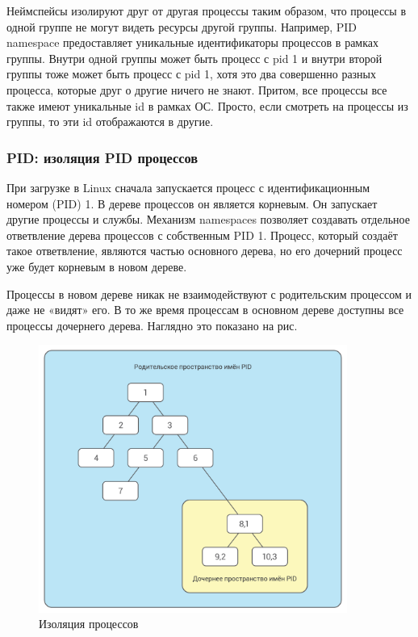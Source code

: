 Неймспейсы изолируют друг от другая процессы таким образом, что процессы в одной группе не могут видеть ресурсы другой группы. Например, PID namespace предоставляет уникальные идентификаторы процессов в рамках группы. Внутри одной группы может быть процесс с pid 1 и внутри второй группы тоже может быть процесс с pid 1, хотя это два совершенно разных процесса, которые друг о другие ничего не знают. Притом, все процессы все также имеют уникальные id в рамках ОС. Просто, если смотреть на процессы из группы, то эти id отображаются в другие.

\subsubsection{PID: изоляция PID процессов}

При загрузке в Linux сначала запускается процесс с идентификационным номером (PID) 1. В дереве процессов он является корневым. Он запускает другие процессы и службы. Механизм namespaces позволяет создавать отдельное ответвление дерева процессов с собственным PID 1. Процесс, который создаёт такое ответвление, являются частью основного дерева, но его дочерний процесс уже будет корневым в новом дереве.

Процессы в новом дереве никак не взаимодействуют с родительским процессом и даже не «видят» его. В то же время процессам в основном дереве доступны все процессы дочернего дерева. Наглядно это показано на рис.

\begin{figure}[h!]
\centering
\includegraphics[width=0.9\textwidth]{img/pid.png}
\caption{Изоляция процессов}
\label{pid}
\end{figure}

